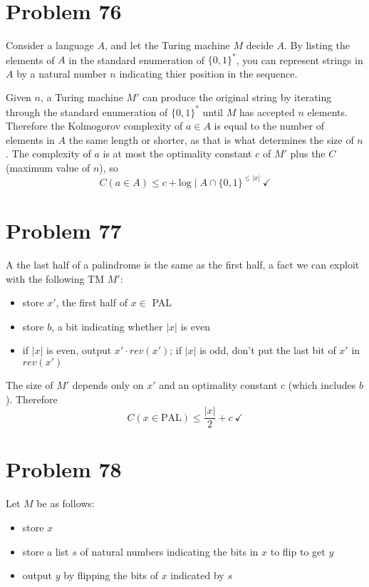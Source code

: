 \documentclass[11pt]{article}
\begin{document}
\section*{Problem 76}

Consider a language $A$, and let the Turing machine $M$ decide $A$.
By listing the elements of $A$ in the standard enumeration of $\{0,1\}^*$, you can represent strings in $A$ by a natural number $n$ indicating thier position in the sequence.

Given $n$, a Turing machine $M'$ can produce the original string by iterating through the standard enumeration of $\{0,1\}^*$ until $M$ has accepted $n$ elements.
Therefore the Kolmogorov complexity of $a \in A$ is equal to the number of elements in $A$ the same length or shorter, as that is what determines the size of $n$.
The complexity of $a$ is at most the optimality constant $c$ of $M'$ plus the $C$(maximum value of $n$), so
\[C(a \in A) \leq c + \text{log} \mid A \cap \{0,1\}^{\leq |x|}\ \checkmark \]


\section*{Problem 77}

A the last half of a palindrome is the same as the first half, a fact we can exploit with the following TM $M'$:

\begin{itemize}
	\item store $x'$, the first half of $x \in $ PAL
	\item store $b$, a bit indicating whether $|x|$ is even
	\item if $|x|$ is even, output $x' \cdot rev( x' )$; if $|x|$ is odd, don't put the last bit of $x'$ in $rev( x' )$
\end{itemize}

The size of $M'$ depends only on $x'$ and an optimality constant $c$ (which includes $b$). Therefore
	\[C(x \in \text{PAL}) \leq \dfrac{|x|}{2} + c \ \checkmark\]

\section*{Problem 78}

Let $M$ be as follows:

\begin{itemize}
	\item store $x$
	\item store a list $s$ of natural numbers indicating the bits in $x$ to flip to get $y$
	\item output $y$ by flipping the bits of $x$ indicated by $s$
\end{itemize}
\end{document}
